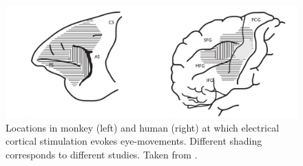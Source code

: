 \documentclass[a4paper, 12pt]{scrreprt}
\begin{document}
\begin{figure}[H]
	\includegraphics[scale=0.3]{img/FEF.png}
	\caption[Anatomical location of the FEF]{\small{Locations in monkey (left) and human (right) at which electrical cortical stimulation evokes eye-movements. Different shading corresponds to different studies. Taken from \textcite{blanke2000FEF}.}}
	\label{fig:FEF_reg}
\end{figure}
\end{document}
